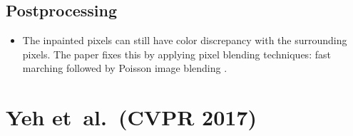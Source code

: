 \documentclass[10pt]{article}
\newcommand{\etal}{{et~al.}}
\begin{document}
  \subsection{Postprocessing}

  \begin{itemize}
  	\item The inpainted pixels can still have color discrepancy with the surrounding pixels. The paper fixes this by applying pixel blending techniques: fast marching \cite{Telea:2004} followed by Poisson image blending \cite{Perez:2003}.
  \end{itemize}

  \section{Yeh \etal~(CVPR 2017)}
\end{document}
